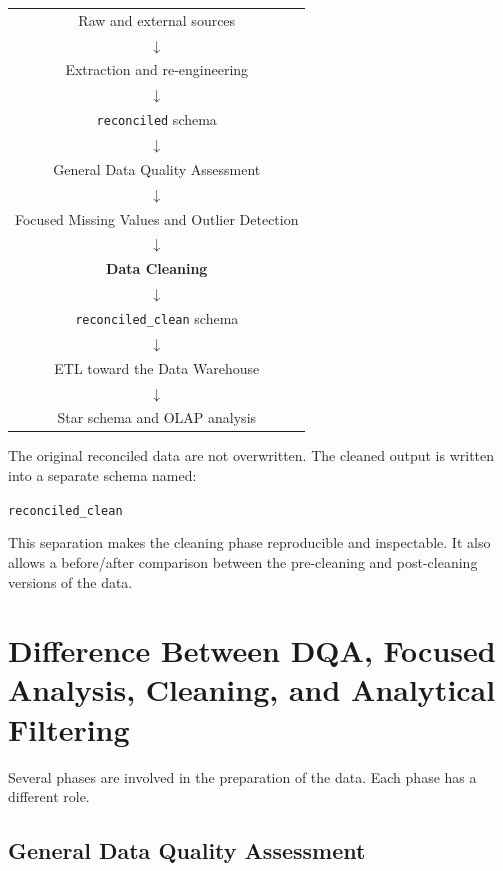 \documentclass[a4paper,11pt]{article}
\begin{document}
	\begin{center}
		\begin{tabular}{c}
			Raw and external sources \\
			$\downarrow$ \\
			Extraction and re-engineering \\
			$\downarrow$ \\
			\texttt{reconciled} schema \\
			$\downarrow$ \\
			General Data Quality Assessment \\
			$\downarrow$ \\
			Focused Missing Values and Outlier Detection \\
			$\downarrow$ \\
			\textbf{Data Cleaning} \\
			$\downarrow$ \\
			\texttt{reconciled\_clean} schema \\
			$\downarrow$ \\
			ETL toward the Data Warehouse \\
			$\downarrow$ \\
			Star schema and OLAP analysis
		\end{tabular}
	\end{center}
	
	The original reconciled data are not overwritten.
	The cleaned output is written into a separate schema named:
	
	\begin{center}
		\texttt{reconciled\_clean}
	\end{center}
	
	This separation makes the cleaning phase reproducible and inspectable.
	It also allows a before/after comparison between the pre-cleaning and post-cleaning versions of the data.
	
	\section{Difference Between DQA, Focused Analysis, Cleaning, and Analytical Filtering}
	
	Several phases are involved in the preparation of the data.
	Each phase has a different role.
	
	\subsection{General Data Quality Assessment}
	
\end{document}

